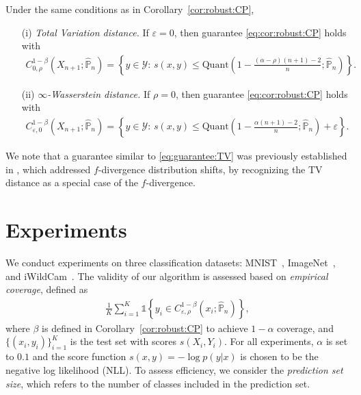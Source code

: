 \documentclass[11pt,a4paper]{article}
\begin{document}
\begin{corollary}
\label{cor:TV:Winf}
Under the same conditions as in Corollary~\ref{cor:robust:CP},
\begin{itemize}
    \item[(i)] \emph{Total Variation distance.} If $\varepsilon = 0$, then guarantee \eqref{eq:cor:robust:CP} holds with
    \begin{align}
    \label{eq:guarantee:TV}
        C_{0,\rho}^{1-\beta}(X_{n+1};\widehat{\mathbb P}_n) = \left\{y\in\mathcal{Y}:\,s(x,y)\leq \text{Quant} \left(1 - \frac{(\alpha-\rho) (n+1) -2}{n}; \widehat{\mathbb P}_n \right)
        \right\}.
    \end{align}
    \item[(ii)] \emph{$\infty$-Wasserstein distance.} If $\rho = 0$, then guarantee \eqref{eq:cor:robust:CP} holds with
    \begin{align}
    \label{eq:guarantee:Winf}
        C_{\varepsilon, 0}^{1-\beta}(X_{n+1};\widehat{\mathbb P}_n) = \left\{y\in\mathcal{Y}:\,s(x,y)\leq \text{Quant} \left(1 - \frac{\alpha (n+1)-2}{n}; \widehat{\mathbb P}_n \right) + \varepsilon
        \right\}.
    \end{align}
\end{itemize}
\end{corollary}

We note that a guarantee similar to \eqref{eq:guarantee:TV} was previously established in \cite{cauchois2024robust}, which addressed $f$-divergence distribution shifts, by recognizing the TV distance as a special case of the $f$-divergence.







\section{Experiments}

We conduct experiments on three classification datasets: MNIST~\cite{Lecun_1998},  ImageNet~\cite{Li_2009}, and iWildCam~\cite{Beery_2020}. The validity of our algorithm is assessed based on \emph{empirical coverage}, defined as 
\begin{align*}\frac{1}{K} \sum^K_{i=1}\mathds{1}\left\{y_i \in C_{\varepsilon,\rho}^{1-\beta}\left(x_i;\widehat{\mathbb P}_n \right)\right\},
\end{align*}
where $\beta$ is defined in Corollary~\ref{cor:robust:CP} to achieve $1-\alpha$ coverage, and $\{(x_i, y_i)\}^K_{i=1}$ is the test set with scores $s(X_i, Y_i)$. For all experiments, $\alpha$ is set to $0.1$ and the score function $s(x, y) = -\log p(y|x)$ is chosen to be the negative log likelihood (NLL). To assess efficiency, we consider the \emph{prediction set size}, which refers to the number of classes included in the prediction set. 
\end{document}
